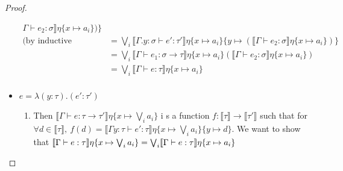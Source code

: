 \begin{proof}
\begin{itemize}
\begin{align*}
\Gamma \vdash e_2 : \sigma \rrbracket\eta\{x \mapsto a_i\})\} \\
\text{(by inductive hypothesis)}&= \bigvee_i \llbracket \Gamma. y : \sigma \vdash e' : \tau' \rrbracket\eta\{x \mapsto 
a_i\}\{y \mapsto (\llbracket \Gamma \vdash e_2 : \sigma \rrbracket\eta\{x \mapsto a_i\})\} \\
&=\bigvee_i \llbracket \Gamma \vdash e_1: \sigma \rightarrow \tau\rrbracket\eta\{x\mapsto a_i\}
(\llbracket\Gamma\vdash e_2 : \sigma\rrbracket\eta\{x\mapsto a_i\}) \\
&= \bigvee_i \llbracket \Gamma \vdash e:\tau\rrbracket\eta\{ x \mapsto a_i\} \\
\end{align*}
 \item $e = \lambda (y : \tau) . (e' : \tau')$
 \begin{enumerate}
 \item Then $\llbracket \Gamma \vdash e : \tau \rightarrow \tau' \rrbracket\eta\{x\mapsto  \bigvee_i a_i\}$ i
 s a function $f: \llbracket \tau \rrbracket \rightarrow \llbracket \tau'  \rrbracket$ such that for 
 $\forall d \in \llbracket \tau \rrbracket, \ f(d) = \llbracket \Gamma y : \tau \vdash e' : \tau 
 \rrbracket\eta\{x\mapsto  \bigvee_i a_i\}\{y \mapsto d\}$. We want to show that
 $\llbracket{{\Gamma}\vdash{e}:{\tau}}\rrbracket{\eta\{{x}\mapsto{\bigvee_i a_i}\}} =
\bigvee_i\llbracket{{\Gamma}\vdash{e}:{\tau}}\rrbracket{\eta\{{x}\mapsto{a_i}\}}$
 

\end{enumerate}
\end{itemize}
\end{proof}
